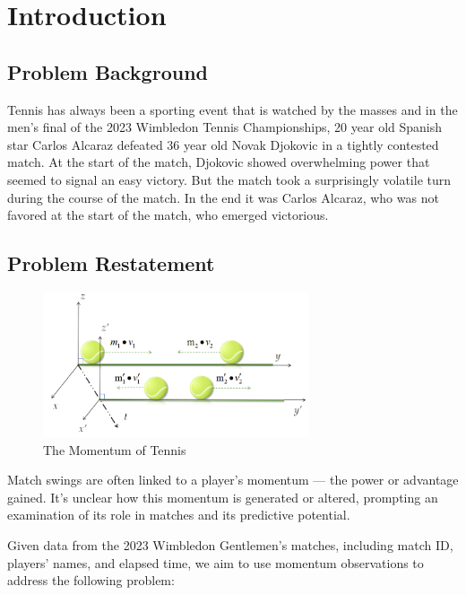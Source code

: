 \section{Introduction}
\subsection{Problem Background}

Tennis has always been a sporting event that is watched by the masses and in the men's final of the 2023 Wimbledon Tennis Championships, 20 year old Spanish star Carlos Alcaraz defeated 36 year old Novak Djokovic in a tightly contested match. At the start of the match, Djokovic showed overwhelming power that seemed to signal an easy victory. But the match took a surprisingly volatile turn during the course of the match. In the end it was Carlos Alcaraz, who was not favored at the start of the match, who emerged victorious.

\subsection{Problem Restatement}

\begin{figure}[h]
    \centering
    \includegraphics[width=0.7\textwidth]{figure/collision_of_tennis_balls(2).png}
    \caption{The Momentum of Tennis}
    \label{fig:correlation_heatmap }
\end{figure}
% 




Match swings are often linked to a player's momentum — the power or advantage gained. It's unclear how this momentum is generated or altered, prompting an examination of its role in matches and its predictive potential.

Given data from the 2023 Wimbledon Gentlemen's matches, including match ID, players' names, and elapsed time, we aim to use momentum observations to address the following problem:

